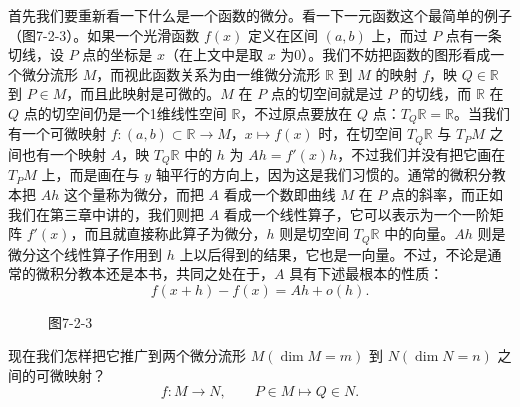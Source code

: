 首先我们要重新看一下什么是一个函数的微分。看一下一元函数这个最简单的例子（图7-2-3）。如果一个光滑函数 $f(x)$ 定义在区间 $(a,b)$ 上，而过 $P$ 点有一条切线，设 $P$ 点的坐标是 $x$（在上文中是取 $x$ 为0）。我们不妨把函数的图形看成一个微分流形 $M$，而视此函数关系为由一维微分流形 $\mathbb R$ 到 $M$ 的映射 $f$，映 $Q\in\mathbb R$ 到 $P\in M$，而且此映射是可微的。$M$ 在 $P$ 点的切空间就是过 $P$ 的切线，而 $\mathbb R$ 在 $Q$ 点的切空间仍是一个1维线性空间 $\mathbb R$，不过原点要放在 $Q$ 点：$T_Q\mathbb R=\mathbb R$。当我们有一个可微映射 $f:(a,b)\subset\mathbb R\to M$，$x\mapsto f(x)$ 时，在切空间 $T_Q\mathbb R$ 与 $T_PM$ 之间也有一个映射 $A$，映 $T_Q\mathbb R$ 中的 $h$ 为 $Ah=f'(x)h$，不过我们并没有把它画在 $T_PM$ 上，而是画在与 $y$ 轴平行的方向上，因为这是我们习惯的。通常的微积分教本把 $Ah$ 这个量称为微分，而把 $A$ 看成一个数即曲线 $M$ 在 $P$ 点的斜率，而正如我们在第三章中讲的，我们则把 $A$ 看成一个线性算子，它可以表示为一个一阶矩阵 $f'(x)$，而且就直接称此算子为微分，$h$ 则是切空间 $T_Q\mathbb R$ 中的向量。$Ah$ 则是微分这个线性算子作用到 $h$ 上以后得到的结果，它也是一向量。不过，不论是通常的微积分教本还是本书，共同之处在于，$A$ 具有下述最根本的性质：
\begin{equation}
 f(x+h)-f(x)=Ah+o(h).
 \tag{21}
\end{equation}

\begin{figure}[htbp]
\centering
{}
\caption*{图7-2-3}
\end{figure}

现在我们怎样把它推广到两个微分流形 $M(\dim M=m)$ 到 $N(\dim N=n)$ 之间的可微映射？
\[
 f:M\to N,
 \qquad P\in M\longmapsto Q\in N.
\]

